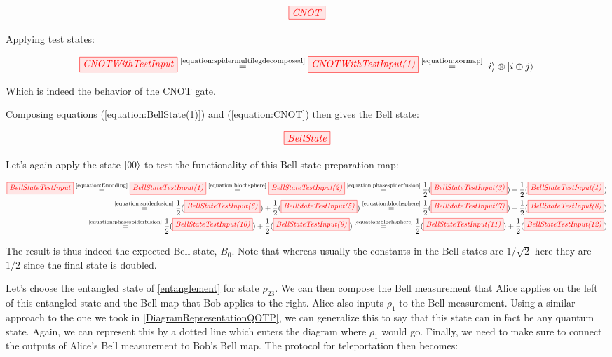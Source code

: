 \documentclass[]{article}
\newcommand{\equaltext}[1]{\ensuremath{\stackrel{\text{#1}}{=}}}
\begin{document}
\begin{equation}
	\label{equation:CNOT}
	\tikzfig{CNOT}
\end{equation}

Applying test states:

\begin{equation}
	\tikzfig{CNOTWithTestInput} \equaltext{\ref{equation:spidermultilegdecomposed}} \tikzfig{CNOTWithTestInput(1)} \equaltext{\ref{equation:xormap}} \ket{i} \otimes \ket{i \oplus j}
\end{equation}

Which is indeed the behavior of the CNOT gate.

Composing equations (\ref{equation:BellState(1)}) and (\ref{equation:CNOT}) then gives the Bell state:

\begin{equation}
	\tikzfig{BellState}
\end{equation}

Let's again apply the state $\ket{00}$ to test the functionality of this Bell state preparation map:

\begin{equation}
\label{BellStateTestInput}
	\begin{split}
	\tikzfig{BellStateTestInput} \equaltext{\ref{equation:Encoding}} \tikzfig{BellStateTestInput(1)} \equaltext{\ref{equation:blochsphere}} \tikzfig{BellStateTestInput(2)} \equaltext{\ref{equation:phasespiderfusion}}
	 \frac{1}{2}(\tikzfig{BellStateTestInput(3)})+
	\frac{1}{2}(\tikzfig{BellStateTestInput(4)}) 
 \\ \equaltext{\ref{equation:spiderfusion}}
 	\frac{1}{2}(\tikzfig{BellStateTestInput(6)}) +
  \frac{1}{2}(\tikzfig{BellStateTestInput(5)}) 
	\equaltext{\ref{equation:blochsphere}} \frac{1}{2}(\tikzfig{BellStateTestInput(7)}) + \frac{1}{2}(\tikzfig{BellStateTestInput(8)}) \\ \equaltext{\ref{equation:phasespiderfusion}}
	\frac{1}{2}(\tikzfig{BellStateTestInput(10)}) +
	 \frac{1}{2}(\tikzfig{BellStateTestInput(9)}) 
	 \equaltext{\ref{equation:blochsphere}} \frac{1}{2}(\tikzfig{BellStateTestInput(11)}) +
	\frac{1}{2}(\tikzfig{BellStateTestInput(12)})
	\end{split}
\end{equation}

The result is thus indeed the expected Bell state, $B_0$. Note that whereas usually the constants in the Bell states are $1/\sqrt{2}$ here they are $1/2$ since the final state is doubled.

Let's choose the entangled state of \ref{entanglement} for state $\rho_{23}$. We can then compose the Bell measurement that Alice applies on the left of this entangled state and the Bell map that Bob applies to the right. Alice also inputs $\rho_1$ to the Bell measurement. Using a similar approach to the one we took in \ref{DiagramRepresentationQOTP}, we can generalize this to say that this state can in fact be any quantum state. Again, we can represent this by a dotted line which enters the diagram where $\rho_1$ would go. Finally, we need to make sure to connect the outputs of Alice's Bell measurement to Bob's Bell map. The protocol for teleportation then becomes: 
 
\end{document}
